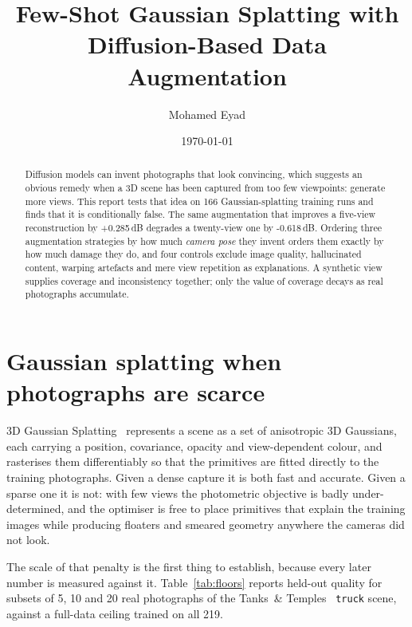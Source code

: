 \documentclass{article}
\title{Few-Shot Gaussian Splatting with Diffusion-Based Data Augmentation}
\author{Mohamed Eyad}
\date{\today}
\begin{document}
\coverpage%

\tableofcontents
\newpage

\begin{abstract}
\noindent
Diffusion models can invent photographs that look convincing, which suggests an
obvious remedy when a 3D scene has been captured from too few viewpoints:
generate more views. This report tests that idea on 166 Gaussian-splatting
training runs and finds that it is conditionally false. The same augmentation
that improves a five-view reconstruction by +0.285\,dB degrades a twenty-view
one by -0.618\,dB. Ordering three augmentation strategies by how much
\emph{camera pose} they invent orders them exactly by how much damage they do,
and four controls exclude image quality, hallucinated content, warping
artefacts and mere view repetition as explanations. A synthetic view supplies
coverage and inconsistency together; only the value of coverage decays as real
photographs accumulate.
\end{abstract}

\section{Gaussian splatting when photographs are scarce}

3D Gaussian Splatting~\cite{kerbl3Dgaussians} represents a scene as a set of
anisotropic 3D Gaussians, each carrying a position, covariance, opacity and
view-dependent colour, and rasterises them differentiably so that the primitives
are fitted directly to the training photographs. Given a dense capture it is
both fast and accurate. Given a sparse one it is not: with few views the
photometric objective is badly under-determined, and the optimiser is free to
place primitives that explain the training images while producing floaters and
smeared geometry anywhere the cameras did not look.

The scale of that penalty is the first thing to establish, because every later
number is measured against it. Table~\ref{tab:floors} reports held-out quality
for subsets of 5, 10 and 20 real photographs of the Tanks~\&
Temples~\cite{knapitsch2017tanks} \texttt{truck} scene, against a full-data
ceiling trained on all 219.
\end{document}
